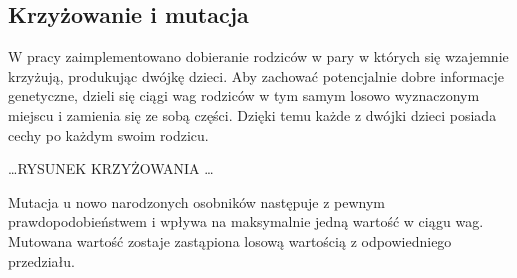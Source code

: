 \subsection{Krzyżowanie i mutacja}

W pracy zaimplementowano dobieranie rodziców w pary w których się wzajemnie krzyżują, produkując dwójkę dzieci. Aby zachować potencjalnie dobre informacje genetyczne, dzieli się ciągi wag rodziców w tym samym losowo wyznaczonym miejscu i zamienia się ze sobą części. Dzięki temu każde z dwójki dzieci posiada cechy po każdym swoim rodzicu.

\ldots RYSUNEK KRZYŻOWANIA \ldots

Mutacja u nowo narodzonych osobników następuje z pewnym prawdopodobieństwem i wpływa na maksymalnie jedną wartość w ciągu wag. Mutowana wartość zostaje zastąpiona losową wartością z odpowiedniego przedziału.


